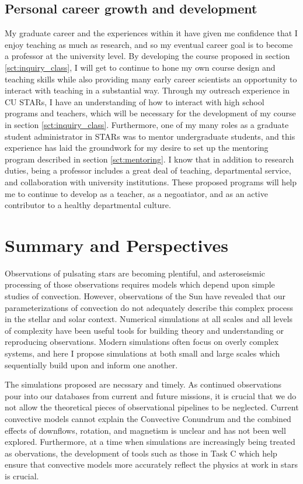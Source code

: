 \documentclass[aasms,11pt, longbibliography]{article}
\begin{document}
\subsection{Personal career growth and development}
\label{sct:personal_growth}
My graduate career and the experiences within it have given me confidence that I enjoy teaching as much as research, and so my eventual career goal is to become a professor at the university level.
By developing the course proposed in section \ref{sct:inquiry_class}, I will get to continue to hone my own course design and teaching skills while also providing many early career scientists an opportunity to interact with teaching in a substantial way.
Through my outreach experience in CU STARs, I have an understanding of how to interact with high school programs and teachers, which will be necessary for the development of my course in section \ref{sct:inquiry_class}.
Furthermore, one of my many roles as a graduate student administrator in STARs was to mentor undergraduate students, and this experience has laid the groundwork for my desire to set up the mentoring program described in section \ref{sct:mentoring}.
I know that in addition to research duties, being a professor includes a great deal of teaching, departmental service, and collaboration with university institutions.
These proposed programs will help me to continue to develop as a teacher, as a negoatiator, and as an active contributor to a healthy departmental culture.

\section{Summary and Perspectives}
\vspace{-6pt}
Observations of pulsating stars are becoming plentiful, and asteroseismic processing of those observations requires models which depend upon simple studies of convection.
However, observations of the Sun have revealed that our parameterizations of convection do not adequately describe this complex process in the stellar and solar context.
Numerical simulations at all scales and all levels of complexity have been useful tools for building theory and understanding or reproducing observations.
Modern simulations often focus on overly complex systems, and here I propose simulations at both small and large scales which sequentially build upon and inform one another.

The simulations proposed are necssary and timely.
As continued observations pour into our databases from current and future missions, it is crucial that we do not allow the theoretical pieces of observational pipelines to be neglected.
Current convective models cannot explain the Convective Conundrum and the combined effects of downflows, rotation, and magnetism is unclear and has not been well explored.
Furthermore, at a time when simulations are increasingly being treated as obervations, the development of tools such as those in Task C which help ensure that convective models more accurately reflect the physics at work in stars is crucial.
\end{document}
